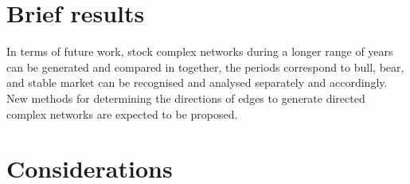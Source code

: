 \section{Brief results}
In terms of future work, stock complex networks during a longer range of years can be generated and compared in together, the periods correspond to bull, bear, and stable market can be recognised and analysed separately and accordingly. New methods for determining the directions of edges to generate directed complex networks are expected to be proposed.

\section{Considerations}
